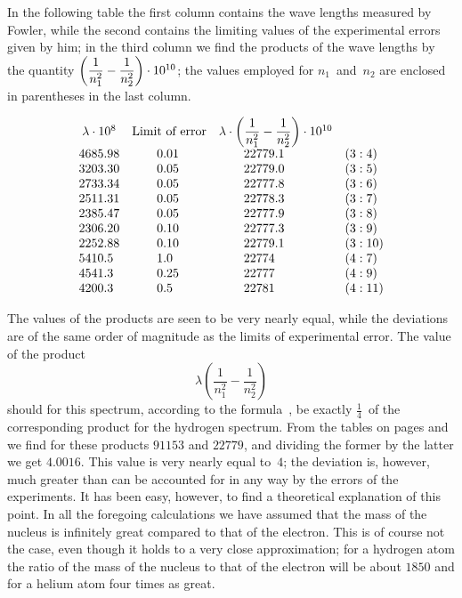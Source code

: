 In the following table the first column contains the wave
lengths measured by Fowler, while the second contains the limiting
values of the experimental errors given by him; in the third
column we find the products of the wave lengths by the quantity
$\left(\dfrac{1}{n_{1}^{2}} - \dfrac{1}{n_{2}^{2}}\right) \cdot 10^{10}$; the values employed for $n_{1}$~and~$n_{2}$ are enclosed in
parentheses in the last column.
\begin{table}[hbt]
\[
\begin{array}{l*{2}{>{\qquad}l}l}
\ColHead{\lambda \cdot 10^{8}} &
\ColHead{\text{Limit of error}} &
\ColHead{\lambda \cdot \left(\dfrac{1}{n_{1}^{2}} - \dfrac{1}{n_{2}^{2}}\right) \cdot 10^{10}} & \\
4685.98 & 0.01 & 22779.1 & (3 : 4) \\
3203.30 & 0.05 & 22779.0 & (3 : 5) \\
2733.34 & 0.05 & 22777.8 & (3 : 6) \\
2511.31 & 0.05 & 22778.3 & (3 : 7) \\
2385.47 & 0.05 & 22777.9 & (3 : 8) \\
2306.20 & 0.10 & 22777.3 & (3 : 9) \\
2252.88 & 0.10 & 22779.1 & (3 : 10) \\
5410.5  & 1.0  & 22774   & (4 : 7) \\
4541.3  & 0.25 & 22777   & (4 : 9) \\
4200.3  & 0.5  & 22781   & (4 : 11) \\
\end{array}
\]
\end{table}

The values of the products are seen to be very nearly equal,
while the deviations are of the same order of magnitude as the
limits of experimental error. The value of the product
\[
\lambda \left(\frac{1}{n_{1}^{2}} - \frac{1}{n_{2}^{2}}\right)
\]
should for this spectrum, according to the formula~, be exactly
$\frac{1}{4}$~of the corresponding product for the hydrogen spectrum. From
the tables on pages  and~ we find for these products $91153$
and $22779$, and dividing the former by the latter we get $4.0016$.
This value is very nearly equal to~$4$; the deviation is, however,
much greater than can be accounted for in any way by the errors
of the experiments. It has been easy, however, to find a theoretical
explanation of this point. In all the foregoing calculations
we have assumed that the mass of the nucleus is infinitely great
compared to that of the electron. This is of course not the
case, even though it holds to a very close approximation; for a
hydrogen atom the ratio of the mass of the nucleus to that of the
electron will be about $1850$ and for a helium atom four times as
great.


